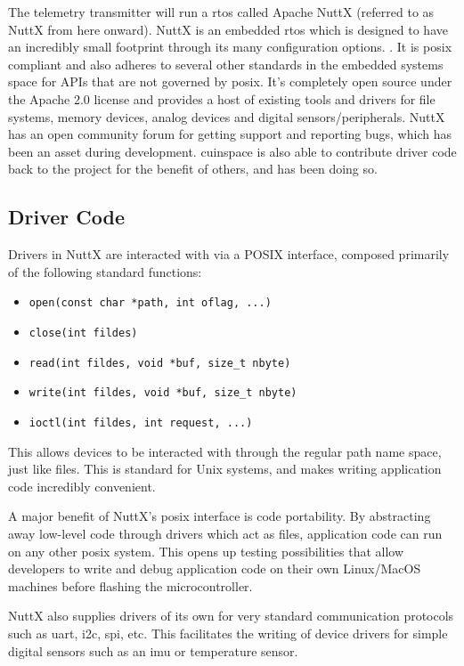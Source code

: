 The telemetry transmitter will run a \gls{rtos} called Apache NuttX (referred to as NuttX from here onward). NuttX is
an embedded \gls{rtos} which is designed to have an incredibly small footprint through its many configuration options.
\cite{nuttx-about}. It is \gls{posix} compliant and also adheres to several other standards in the embedded systems
space for APIs that are not governed by \gls{posix}. \cite{nuttx-about} It's completely open source under the Apache
2.0 license and provides a host of existing tools and drivers for file systems, memory devices, analog devices and
digital sensors/peripherals. NuttX has an open community forum for getting support and reporting bugs, which has been
an asset during development. \Gls{cuinspace} is also able to contribute driver code back to the project for the benefit
of others, and has been doing so.

\subsection{Driver Code}

Drivers in NuttX are interacted with via a POSIX interface, composed primarily of the following standard functions:

\begin{itemize}
    \item \texttt{open(const char *path, int oflag, ...)}
    \item \texttt{close(int fildes)}
    \item \texttt{read(int fildes, void *buf, size\_t nbyte)}
    \item \texttt{write(int fildes, void *buf, size\_t nbyte)}
    \item \texttt{ioctl(int fildes, int request, ...)}
\end{itemize}

This allows devices to be interacted with through the regular path name space, just like files. This is standard for
Unix systems, and makes writing application code incredibly convenient.

A major benefit of NuttX's \gls{posix} interface is code portability. By abstracting away low-level code through
drivers which act as files, application code can run on any other \gls{posix} system. This opens up testing
possibilities that allow developers to write and debug application code on their own Linux/MacOS machines before
flashing the microcontroller.

NuttX also supplies drivers of its own for very standard communication protocols such as \gls{uart}, \gls{i2c},
\gls{spi}, etc. This facilitates the writing of device drivers for simple digital sensors such as an \gls{imu} or
temperature sensor.


